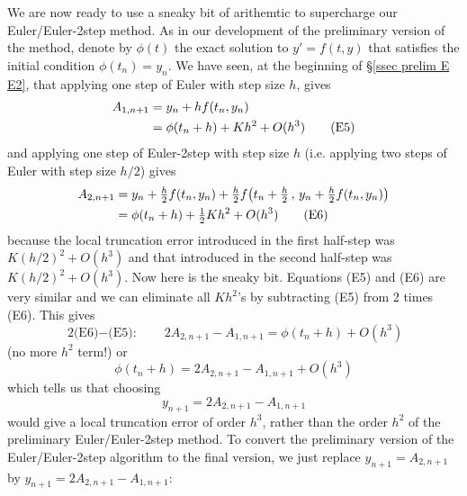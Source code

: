 We are now ready to use a sneaky bit of arithemtic to supercharge our Euler/Euler-2step method.
As in our development of the preliminary version of the method,
denote by $\phi(t)$ the exact solution to $y'=f(t,y)$ that satisfies the
initial condition $\phi(t_n)=y_n$. We have seen, at the beginning of 
\S\ref{ssec prelim E E2}, that
applying one step of Euler with step size $h$, gives
\begin{align}
A_{1,n+1}&=y_n+hf(t_n,y_n) \notag\\
         &=\phi(t_n+h)+Kh^2+O(h^3)
\tag{E5}\end{align}
and applying one step of Euler-2step with step size $h$ (i.e. applying two 
steps of Euler with step size $h/2$) gives
\begin{align}
A_{2,n+1} &= y_n+\tfrac{h}{2}f(t_n,y_n)
 +\tfrac{h}{2}f\big(t_n+\tfrac{h}{2}\,,\,y_n+\tfrac{h}{2}f(t_n,y_n)\big)\notag\\
          &=\phi(t_n+h)+\tfrac{1}{2} Kh^2+O(h^3)
\tag{E6}\end{align}
because the local truncation error introduced in the first half-step was $K(h/2)^2+O(h^3)$ and that introduced in the second half-step was 
$K(h/2)^2+O(h^3)$.
Now here is the sneaky bit. Equations (E5) and (E6) are very similar and we can eliminate all $Kh^2$'s by subtracting (E5) from $2$ times (E6). This gives
\begin{equation*}
\text{2(E6)$-$(E5):}\qquad
2A_{2,n+1}-A_{1,n+1} = \phi(t_n+h) +O(h^3)
\end{equation*}
(no more $h^2$ term!) or
\begin{equation*}
\phi(t_n+h)= 2A_{2,n+1}-A_{1,n+1}+O(h^3)
\tag{E7}\end{equation*} 
which tells us that choosing
\begin{equation*}
y_{n+1}=2A_{2,n+1}-A_{1,n+1}
\tag{E8}\end{equation*}
would give a local truncation error of order $h^3$, rather than 
the order $h^2$ of the preliminary Euler/Euler-2step method.
To convert the preliminary version of the Euler/Euler-2step algorithm 
to the final version, we just replace $y_{n+1}=A_{2,n+1}$ by
$y_{n+1} = 2A_{2,n+1}-A_{1,n+1}$:


